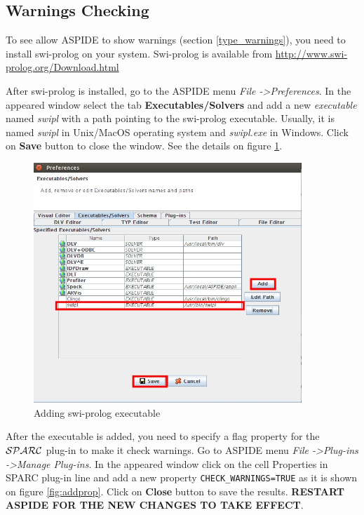\documentclass[12pt, letterpaper]{article}
\begin{document}
 
\subsection{Warnings Checking}

To see allow ASPIDE to show warnings (section \ref{type_warnings}), you need to install swi-prolog on your system. Swi-prolog is available from  {\scriptsize
\url{http://www.swi-prolog.org/Download.html}
} 

After swi-prolog is installed, go to the ASPIDE menu \textit{File -\textgreater Preferences}. In the appeared window select the tab \textbf{Executables/Solvers} and add a new \textit{executable} named \textit{swipl} with a path pointing to the swi-prolog executable. Usually, it is named \textit{swipl} in Unix/MacOS operating system and \textit {swipl.exe} in Windows. Click on \textbf{Save} button to close the window.
See the details on figure \ref{fig:addswipl}.
\begin{figure}[ht]
\centering
\includegraphics[width=0.9\textwidth]{swipl_add.jpg}
\caption{Adding swi-prolog executable}
\label{fig:addswipl}
\end{figure}
\pagebreak
After the executable is added, you need to specify a flag property for the ${\cal SPARC}$ plug-in to make it check warnings.
Go to ASPIDE menu \textit{File -\textgreater Plug-ins -\textgreater  Manage Plug-ins}. In the appeared window click on the cell Properties in SPARC plug-in line and add a new property \texttt{CHECK\_WARNINGS=TRUE} as it is shown on figure \ref{fig:addprop}.
Click on \textbf{Close} button to save the results.
\textbf{RESTART ASPIDE FOR THE NEW CHANGES TO TAKE EFFECT}. 
\end{document}

